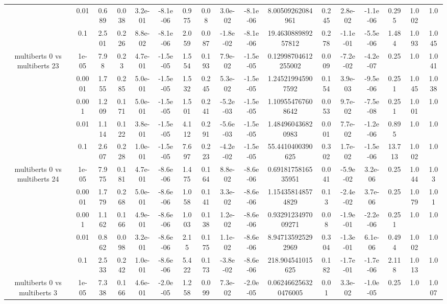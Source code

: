 \begin{tabular}{|c|c|c|c|c|c|c|c|c|c|c|c|c|c|c|c|c|}
 & 0.01 & 0.689 & 0.038 & 3.2e-01 & -8.1e-06 & 0.975 & 0.08 & 3.0e-02 & -8.1e-06 & 8.00509262084961 & 0.245 & 2.8e-02 & -1.1e-06 & 0.295 & 1.002 & 1.0 \\
 & 0.1 & 2.501 & 0.226 & 8.8e-02 & -8.1e-06 & 2.059 & 0.087 & -1.8e-02 & -8.1e-06 & 19.463088989257812 & 0.278 & -1.1e-01 & -5.5e-06 & 1.484 & 1.093 & 1.045 \\
\hline
\multirow{5}{*}{multiberts 0 vs multiberts 23} & 1e-05 & 7.98 & 0.23 & 4.7e-01 & -1.5e-05 & 1.554 & 0.193 & 7.9e-02 & -1.5e-05 & 0.12998704612255002 & 0.009 & -7.2e-02 & -4.2e-07 & 0.25 & 1.0 & 1.041 \\
 & 0.0001 & 1.755 & 0.285 & 5.0e-01 & -1.5e-05 & 1.532 & 0.245 & 5.3e-02 & -1.5e-05 & 1.245219945907592 & 0.154 & 3.9e-03 & -9.5e-06 & 0.251 & 1.045 & 1.038 \\
 & 0.001 & 1.209 & 0.171 & 5.0e-01 & -1.5e-05 & 1.501 & 0.241 & -5.2e-03 & -1.5e-05 & 1.109554767608642 & 0.053 & 9.7e-02 & -7.5e-08 & 0.251 & 1.001 & 1.0 \\
 & 0.01 & 1.114 & 0.122 & 3.8e-01 & -1.5e-05 & 4.112 & 0.291 & -5.6e-03 & -1.5e-05 & 1.484960436820983 & 0.001 & 7.7e-02 & -1.2e-06 & 0.895 & 1.0 & 1.0 \\
 & 0.1 & 2.607 & 0.228 & 1.0e-01 & -1.5e-05 & 7.697 & 0.223 & -4.2e-02 & -1.5e-05 & 55.4410400390625 & 0.302 & 1.7e-02 & -1.5e-06 & 13.713 & 1.002 & 1.0 \\
\hline
\multirow{5}{*}{multiberts 0 vs multiberts 24} & 1e-05 & 7.975 & 0.181 & 4.7e-01 & -8.6e-06 & 1.475 & 0.164 & 8.8e-02 & -8.6e-06 & 0.6918175816535951 & 0.041 & -5.9e-02 & 3.2e-06 & 0.25 & 1.044 & 1.03 \\
 & 0.0001 & 1.779 & 0.268 & 5.0e-01 & -8.6e-06 & 1.058 & 0.141 & 3.3e-02 & -8.6e-06 & 1.154358148574829 & 0.13 & -2.4e-02 & 3.7e-06 & 0.25 & 1.079 & 1.01 \\
 & 0.001 & 1.162 & 0.166 & 4.9e-01 & -8.6e-06 & 1.003 & 0.138 & 1.2e-02 & -8.6e-06 & 0.9329123497009271 & 0.08 & -1.9e-01 & -2.2e-06 & 0.251 & 1.0 & 1.0 \\
 & 0.01 & 0.862 & 0.098 & 3.2e-01 & -8.6e-06 & 2.15 & 0.175 & 1.1e-02 & -8.6e-06 & 8.947135925292969 & 0.304 & -1.3e-01 & 6.1e-06 & 0.494 & 1.002 & 1.0 \\
 & 0.1 & 2.533 & 0.242 & 1.0e-01 & -8.6e-06 & 5.422 & 0.173 & -3.8e-02 & -8.6e-06 & 218.904541015625 & 0.182 & -1.7e-01 & -1.7e-06 & 2.118 & 1.013 & 1.0 \\
\hline
\multirow{5}{*}{multiberts 0 vs multiberts 3} & 1e-05 & 7.338 & 0.166 & 4.6e-01 & -2.0e-05 & 1.258 & 0.099 & 7.3e-02 & -2.0e-05 & 0.062466256320476005 & 0.01 & 3.3e-02 & -1.0e-05 & 0.25 & 1.0 & 1.007 \\

\end{tabular}
